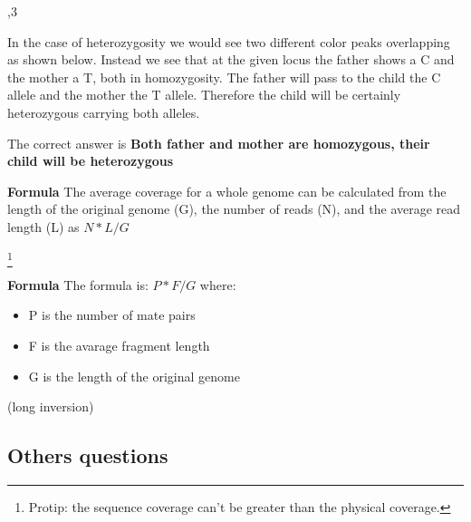 \begin{Answer} [
   ref={ex16},
   number={16}
 ]

  ,3

In the case of heterozygosity we would see two different color peaks
overlapping as shown below.
Instead we see that at the given locus the father shows a C and the mother
a T, both in homozygosity.
The father will pass to the child the C allele and the mother the T allele.
Therefore the child will be certainly heterozygous carrying both alleles.

The correct answer is \textbf{Both father and mother are homozygous,
their child will be heterozygous}

\end{Answer}

\begin{Answer} [
   ref={ex17},
   number={17}
 ]


\textbf{Formula} The average coverage for a whole genome can be calculated
from the length of the original genome (G), the number of reads (N), and the
average read length (L) as $N*L/G$

\end{Answer}

\begin{Answer} [
   ref={ex18},
   number={18}
 ]

  \footnote{Protip: the sequence coverage can't be greater than the
physical coverage.}

\textbf{Formula} The formula is: $P*F/G$ where:
\begin{itemize}
 \item P is the number of mate pairs
 \item F is the avarage fragment length
 \item G is the length of the original genome
\end{itemize}

\end{Answer}

\begin{Answer} [
   ref={ex19},
   number={19}
 ]

   (long inversion)

\end{Answer}

\subsection{Others questions}


